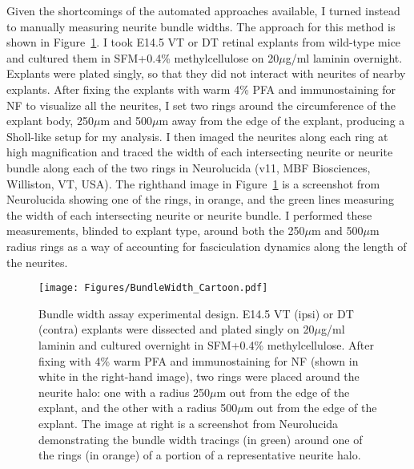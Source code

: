 Given the shortcomings of the automated approaches available, I turned instead to manually measuring neurite bundle widths.
The approach for this method is shown in Figure~\ref{Figures/BundleWidthCartoon}.
I took E14.5 VT or DT retinal explants from wild-type mice and cultured them in SFM+0.4\% methylcellulose on 20$\mu$g/ml laminin overnight.
Explants were plated singly, so that they did not interact with neurites of nearby explants.
After fixing the explants with warm 4\% PFA and immunostaining for NF to visualize all the neurites, I set two rings around the circumference of the explant body, 250$\mu$m and 500$\mu$m away from the edge of the explant, producing a Sholl-like setup for my analysis.
I then imaged the neurites along each ring at high magnification and traced the width of each intersecting neurite or neurite bundle along each of the two rings in Neurolucida (v11, MBF Biosciences, Williston, VT, USA).
The righthand image in Figure~\ref{Figures/BundleWidthCartoon} is a screenshot from Neurolucida showing one of the rings, in orange, and the green lines measuring the width of each intersecting neurite or neurite bundle.
I performed these measurements, blinded to explant type, around both the 250$\mu$m and 500$\mu$m radius rings as a way of accounting for fasciculation dynamics along the length of the neurites.
\begin{figure}[hbtp]
    \begin{center}
        \texttt{[image: Figures/BundleWidth\_Cartoon.pdf]}
        \caption[Bundle width assay experimental design.]
        {Bundle width assay experimental design.
        E14.5 VT (ipsi) or DT (contra) explants were dissected and plated singly on 20$\mu$g/ml laminin and cultured overnight in SFM+0.4\% methylcellulose.
        After fixing with 4\% warm PFA and immunostaining for NF (shown in white in the right-hand image), two rings were placed around the neurite halo: one with a radius 250$\mu$m out from the edge of the explant, and the other with a radius 500$\mu$m out from the edge of the explant.
        The image at right is a screenshot from Neurolucida demonstrating the bundle width tracings (in green) around one of the rings (in orange) of a portion of a representative neurite halo.
        }
        \label{Figures/BundleWidthCartoon}
    \end{center}
\end{figure}

